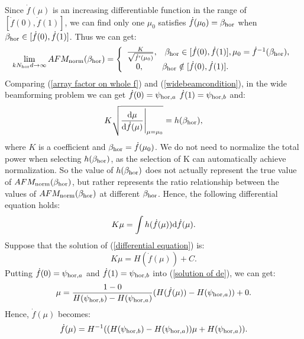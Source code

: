 \documentclass[12pt,draftclsnofoot,onecolumn]{IEEEtran}
\begin{document}
		Since $\dot{f}(\mu)$ is an  increasing differentiable function in the range of  $[\dot{f}(0), \dot{f}(1)]$, we can find only one $\mu_0$ satisfies $\dot{f}(\mu_0)=\beta_{\rm hor}$ when $\beta_{\rm hor}\in [\dot{f}(0),\dot{f}(1)]$. Thus we can get:
		\begin{equation}\label{array factor on whole f}
			\mathop {\lim }\limits_{kN_{\rm hor}d \to \infty } AFM_{\rm norm}({\beta _{\rm hor}}) = \left\{ \begin{array}{l}
				\frac{K}{\sqrt{\dot{f}'(\mu_0)}},\;\;\;\beta_{\rm hor} \in [\dot{f}(0),\dot{f}(1)], \mu_0=\dot{f}^{-1}(\beta_{\rm hor}),\\
				\;\;\;\;0,\;\;\;\;\;\;\;\;\beta_{\rm hor} \notin [\dot{f}(0),\dot{f}(1)].
			\end{array} \right.
		\end{equation}   
		Comparing (\ref{array factor on whole f}) and (\ref{widebeamcondition}), in the wide beamforming problem we can get  $\dot{f}(0)=\psi_{{\rm hor},a}$ $\dot{f}(1)=\psi_{{\rm hor},b}$ and:
		\begin{equation}
			K\sqrt{\frac{{{\rm d}\mu }}{{{\rm d}\dot f(\mu )}}{\Bigg|_{\mu  = {\mu _0}}}} = h({\beta _{\rm hor}}),
		\end{equation} 
		where $K$ is a coefficient and $\beta_{\rm hor}=\dot{f}(\mu_0)$. We do not need to normalize the total power when selecting $h({\beta _{\rm hor}})$, as the selection of K can automatically achieve normalization. So the value of $h({\beta _{\rm hor}})$ does not actually represent the true value of $AFM_{\rm norm}({\beta _{\rm hor}})$, but rather represents the ratio relationship between the values of $AFM_{\rm norm}({\beta _{\rm hor}})$ at different $\beta _{\rm hor}$.
	Hence, the following  differential equation holds:
	\begin{equation}\label{differential equation}
		K\mu  = \int {h(\dot f(\mu )){\rm d}\dot f(\mu )}. 
	\end{equation} 
	Suppose that the solution of (\ref{differential equation}) is:
	\begin{equation}\label{solution of de}
		K\mu  = H(\dot f(\mu )) + C.
	\end{equation} 
	Putting  $\dot{f}(0)=\psi_{{\rm hor},a}$ and $\dot{f}(1)=\psi_{{\rm hor},b}$ into (\ref{solution of de}), we can get:
	\begin{equation}
		\mu  = \frac{{1 - 0}}{{H({\psi _{{\rm hor},b}}) - H({\psi _{{\rm hor},a}})}}(H(\dot f(\mu )) - H({\psi _{{\rm hor},a}})) + 0.
	\end{equation} 
	Hence, $\dot{f}(\mu)$ becomes:
	\begin{equation}\label{continues phaseshift}
		\dot f(\mu ) = {H^{ - 1}}( (H({\psi _{{\rm hor},b}}) - H({\psi _{{\rm hor},a}}))\mu  + H({\psi _{{\rm hor},a}})) .
	\end{equation} 
	
\end{document}
